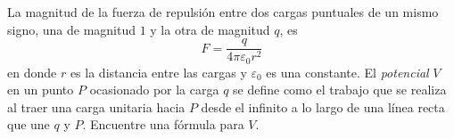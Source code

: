 \item La magnitud de la fuerza de repulsión entre dos cargas puntuales de un mismo signo, una de magnitud $1$ y la otra de magnitud $q$, es
    \[ F = \frac{q}{4\pi\varepsilon_0 r^2} \]
    en donde $r$ es la distancia entre las cargas y $\varepsilon_0$ es una constante. El \textit{potencial} $V$ en un punto $P$ ocasionado por la carga $q$ se define como el trabajo que se realiza al traer una carga unitaria hacia $P$ desde el infinito a lo largo de una línea recta que une $q$ y $P$. Encuentre una fórmula para $V$.

